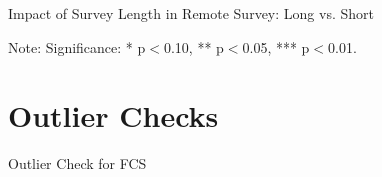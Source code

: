 \documentclass[11pt,harvard]{article}
\begin{document}
	\begin{table}[htbp]
		\centering
		\begin{adjustbox}{max width=\textwidth}
			\begin{threeparttable}
				\caption{Impact of Survey Length in Remote Survey: Long vs. Short}
				\scriptsize
				 
				\label{tab:CAR_Outcome_RM_Length_Balance}
				\begin{tablenotes}
					\item Note: Significance: * p$<$0.10, ** p$<$0.05, *** p$<$0.01. 
				\end{tablenotes}
			\end{threeparttable}
		\end{adjustbox}
	\end{table}
	
	\pagebreak
	
	\section{Outlier Checks}
	
	\begin{table}[htbp]
		\centering
		\begin{adjustbox}{max width=\textwidth}
			\begin{threeparttable}
				\caption{Outlier Check for FCS}
				\scriptsize
				 
				\label{tab:Summary_Stats_Outlier}
			\end{threeparttable}
		\end{adjustbox}
	\end{table}
	
\end{document}
